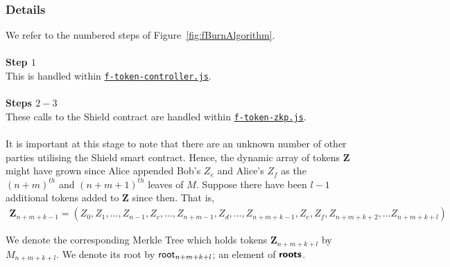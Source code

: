 





\newpage
\subsubsection{Details}
\label{sec:20BurnDetails}

We refer to the numbered steps of Figure~\ref{fig:fBurnAlgorithm}.\\
\\

\textbf{Step $1$}
\ \\
This is handled within \hyperref[sec:f-token-controller]{\texttt{f-token-controller.js}}.\\
\\

\textbf{Steps $2 - 3$}
\ \\
These calls to the Shield contract are handled within \hyperref[sec:f-token-zkp]{\texttt{f-token-zkp.js}}.\\
\\
\noindent
It is important at this stage to note that there are an unknown number of other parties utilising the Shield smart contract.
Hence, the dynamic array of tokens $\bm{Z}$ might have grown since Alice appended Bob's $Z_e$ and Alice's $Z_f$ as the $(n+m)^{th}$ and $(n+m+1)^{th}$ leaves of $M$.
Suppose there have been $l-1$ additional tokens added to $\bm{Z}$ since then.
That is,\\
\begin{align*}
  \bm{Z}_{n+m+k-1} = (Z_0, Z_1,...,Z_{n-1}, Z_c, ..., Z_{n+m-1}, Z_d,..., Z_{n+m+k-1}, Z_e, Z_f, Z_{n+m+k+2}, ... Z_{n+m+k+l})
\end{align*}

\noindent
We denote the corresponding Merkle Tree which holds tokens $\bm{Z}_{n+m+k+l}$ by $M_{n+m+k+l}$. We denote its root by $\mathsf{root}_{n+m+k+l}$; an element of $\bm{\mathsf{roots}}$.


